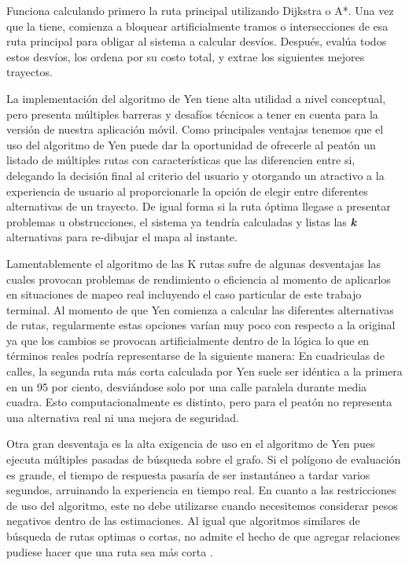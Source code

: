 \begin{itemize}
    Funciona calculando primero la ruta principal utilizando Dijkstra o A*. Una vez que la tiene, comienza a bloquear artificialmente tramos o intersecciones de esa ruta principal para obligar al sistema a calcular desvíos. Después, evalúa todos estos desvíos, los ordena por su costo total, y extrae los siguientes mejores trayectos.

    La implementación del algoritmo de Yen tiene alta utilidad a nivel conceptual, pero presenta múltiples barreras y desafíos técnicos a tener en cuenta para la versión de nuestra aplicación móvil. Como principales ventajas tenemos que el uso del algoritmo de Yen puede dar la oportunidad de ofrecerle al peatón un listado de múltiples rutas con características que las diferencien entre si, delegando la decisión final al criterio del usuario y otorgando un atractivo a la experiencia de usuario al proporcionarle la opción de elegir entre diferentes alternativas de un trayecto. De igual forma si la ruta óptima llegase a presentar problemas u obstrucciones, el sistema ya tendría calculadas y listas las \textbf{\textit{k}} alternativas para re-dibujar el mapa al instante. 

    Lamentablemente el algoritmo de las K rutas sufre de algunas desventajas las cuales provocan problemas de rendimiento o eficiencia al momento de aplicarlos en situaciones de mapeo real incluyendo el caso particular de este trabajo terminal. Al momento de que Yen comienza a calcular las diferentes alternativas de rutas, regularmente estas opciones varían muy poco con respecto a la original ya que los cambios se provocan artificialmente dentro de la lógica lo que en términos reales podría representarse de la siguiente manera: En cuadriculas de calles, la segunda ruta más corta calculada por Yen suele ser idéntica a la primera en un 95 por ciento, desviándose solo por una calle paralela durante media cuadra. Esto computacionalmente es distinto, pero para el peatón no representa una alternativa real ni una mejora de seguridad.

    Otra gran desventaja es la alta exigencia de uso en el algoritmo de Yen pues ejecuta múltiples pasadas de búsqueda sobre el grafo. Si el polígono de evaluación es grande, el tiempo de respuesta pasaría de ser instantáneo a tardar varios segundos, arruinando la experiencia en tiempo real. En cuanto a las restricciones de uso del algoritmo, este no debe utilizarse cuando necesitemos considerar pesos negativos dentro de las estimaciones. Al igual que algoritmos similares de búsqueda de rutas optimas o cortas, no admite el hecho de que agregar relaciones pudiese hacer que una ruta sea más corta \cite{grapheverywhere_yen}.


\end{itemize}
